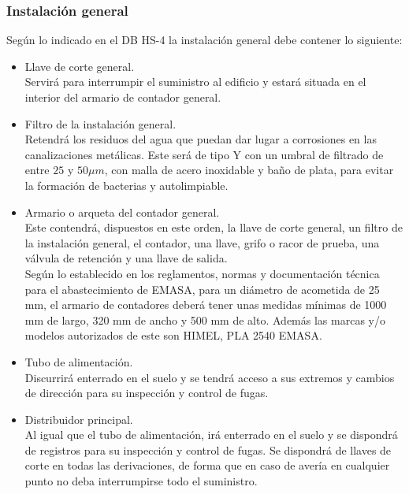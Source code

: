 \documentclass[../main.tex]{subfiles}
\begin{document}
\subsubsection{Instalación general}
Según lo indicado en el DB HS-4 la instalación general debe contener lo siguiente:
\begin{itemize}
    \item Llave de corte general. \\
    Servirá para interrumpir el suministro al edificio y estará situada en el interior del armario de contador general.
    \item Filtro de la instalación general. \\
    Retendrá los residuos del agua que puedan dar lugar a corrosiones en las canalizaciones metálicas. Este será de tipo Y con un umbral de filtrado de entre $25$ y $50 \mu m$, con malla de acero inoxidable y baño de plata, para evitar la formación de bacterias y autolimpiable.
    \item Armario o arqueta del contador general. \\
    Este contendrá, dispuestos en este orden, la llave de corte general, un filtro de la instalación general, el contador, una llave, grifo o racor de prueba, una válvula de retención y una llave de salida. \\
    Según lo establecido en los reglamentos, normas y documentación técnica para el abastecimiento de EMASA, para un diámetro de acometida de 25 mm, el armario de contadores deberá tener unas medidas mínimas de 1000 mm de largo, 320 mm de ancho y 500 mm de alto. Además las marcas y/o modelos autorizados de este son HIMEL, PLA 2540 EMASA.
    \item Tubo de alimentación. \\
    Discurrirá enterrado en el suelo y se tendrá acceso a sus extremos y cambios de dirección para su inspección y control de fugas.
    \item Distribuidor principal. \\
    Al igual que el tubo de alimentación, irá enterrado en el suelo y se dispondrá de registros para su inspección y control de fugas. Se dispondrá de llaves de corte en todas las derivaciones, de forma que en caso de avería en cualquier punto no deba interrumpirse todo el suministro.
\end{itemize}
\end{document}
